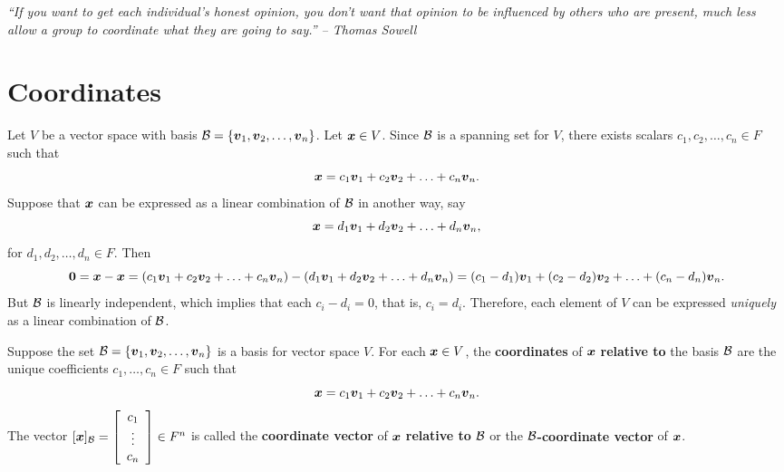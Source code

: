 \begin{center} 
\emph{``If you want to get each individual's honest opinion, you don't want that opinion to be influenced by others who are present, much less allow a group to coordinate what they are going to say.'' -- Thomas Sowell}
\end{center}

\section{Coordinates}\label{sec:coord}
Let $V$ be a vector space with basis $\B = \{\bb v_1, \bb v_2, \ldots, \bb v_n\}$. Let $\bb x \in V$. Since $\B$ is a spanning set for $V$, there exists scalars $c_1, c_2, \ldots, c_n\in F$ such that 
\[\bb x = c_1\bb v_1 + c_2\bb v_2 +\ldots + c_n\bb v_n.\] Suppose that $\bb x$ can be expressed as a linear combination of $\B$ in another way, say 
\[\bb x = d_1\bb v_1 + d_2\bb v_2 +\ldots + d_n\bb v_n,\] for $d_1, d_2, \ldots, d_n\in F$. Then 
\[\bb 0 = \bb x - \bb x = ( c_1\bb v_1 + c_2\bb v_2 +\ldots + c_n\bb v_n) - (d_1\bb v_1 + d_2\bb v_2 +\ldots + d_n\bb v_n) = (c_1-d_1)\bb v_1 + (c_2-d_2)\bb v_2 +\ldots + (c_n-d_n)\bb v_n.\] But $\B$ is linearly independent, which implies that each $c_i-d_i = 0$, that is, $c_i=d_i$. Therefore, each element of $V$ can be expressed \emph{uniquely} as a linear combination of $\B$.\\

\begin{Def} Suppose the set $\B = \{\bb v_1, \bb v_2, \ldots, \bb v_n\}$ is a basis for vector space $V$. For each $\bb x\in V$, the \textbf{coordinates} of $\bb x$ \textbf{relative to} the basis $\B$ are the unique coefficients $c_1, \ldots, c_n \in F$ such that 
\[\bb x = c_1\bb v_1 + c_2\bb v_2 +\ldots + c_n\bb v_n.\] 
 The vector
$[\bb x]_\B = \mtx{c}{c_1\\\vdots\\c_n} \in F^n$ is called the \textbf{coordinate vector} of $\bb x$ \textbf{relative to} $\B$ or the \textbf{$\B$-coordinate vector} of $\bb x$.
\end{Def}\vs 

